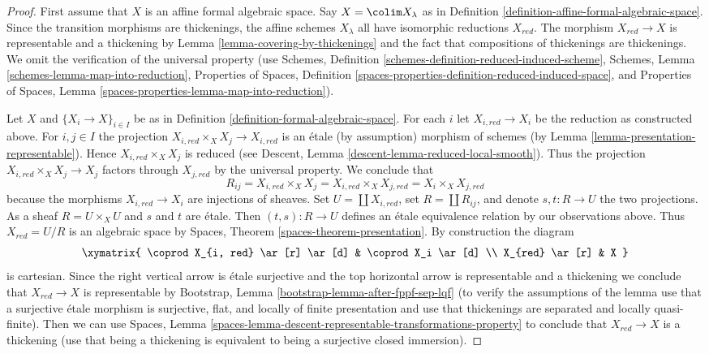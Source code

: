 \begin{proof}
First assume that $X$ is an affine formal algebraic space.
Say $X = \colim X_\lambda$ as in
Definition \ref{definition-affine-formal-algebraic-space}.
Since the transition morphisms are thickenings, the affine
schemes $X_\lambda$ all have isomorphic reductions $X_{red}$.
The morphism $X_{red} \to X$ is representable and a thickening
by Lemma \ref{lemma-covering-by-thickenings} and the fact that
compositions of thickenings are thickenings. We omit the
verification of the universal
property (use Schemes, Definition
\ref{schemes-definition-reduced-induced-scheme},
Schemes, Lemma \ref{schemes-lemma-map-into-reduction},
Properties of Spaces, Definition
\ref{spaces-properties-definition-reduced-induced-space}, and
Properties of Spaces, Lemma \ref{spaces-properties-lemma-map-into-reduction}).

\medskip\noindent
Let $X$ and $\{X_i \to X\}_{i \in I}$ be as in
Definition \ref{definition-formal-algebraic-space}.
For each $i$ let $X_{i, red} \to X_i$ be the reduction as
constructed above. For $i, j \in I$ the projection
$X_{i, red} \times_X X_j \to X_{i, red}$ is an \'etale (by assumption)
morphism of schemes (by Lemma \ref{lemma-presentation-representable}).
Hence $X_{i, red} \times_X X_j$ is reduced (see
Descent, Lemma \ref{descent-lemma-reduced-local-smooth}).
Thus the projection $X_{i, red} \times_X X_j \to X_j$ factors
through $X_{j, red}$ by the universal property. We conclude that
$$
R_{ij} = X_{i, red} \times_X X_j = X_{i, red} \times_X X_{j, red} =
X_i \times_X X_{j, red}
$$
because the morphisms $X_{i, red} \to X_i$ are injections of sheaves.
Set $U = \coprod X_{i, red}$, set
$R = \coprod R_{ij}$, and denote $s, t : R \to U$ the two
projections. As a sheaf $R = U \times_X U$ and $s$ and $t$
are \'etale. Then $(t, s) : R \to U$ defines an \'etale equivalence
relation by our observations above. Thus $X_{red} = U/R$ is an
algebraic space by Spaces, Theorem \ref{spaces-theorem-presentation}.
By construction the diagram
$$
\xymatrix{
\coprod X_{i, red} \ar[r] \ar[d] & \coprod X_i \ar[d] \\
X_{red} \ar[r] & X
}
$$
is cartesian. Since the right vertical arrow is \'etale surjective
and the top horizontal arrow is representable and a thickening
we conclude that $X_{red} \to X$ is representable by
Bootstrap, Lemma \ref{bootstrap-lemma-after-fppf-sep-lqf}
(to verify the assumptions of the lemma use that a surjective
\'etale morphism is surjective, flat, and locally of finite
presentation and use that thickenings are separated and locally quasi-finite).
Then we can use Spaces, Lemma
\ref{spaces-lemma-descent-representable-transformations-property}
to conclude that $X_{red} \to X$ is a thickening
(use that being a thickening is equivalent to being
a surjective closed immersion).


\end{proof}
